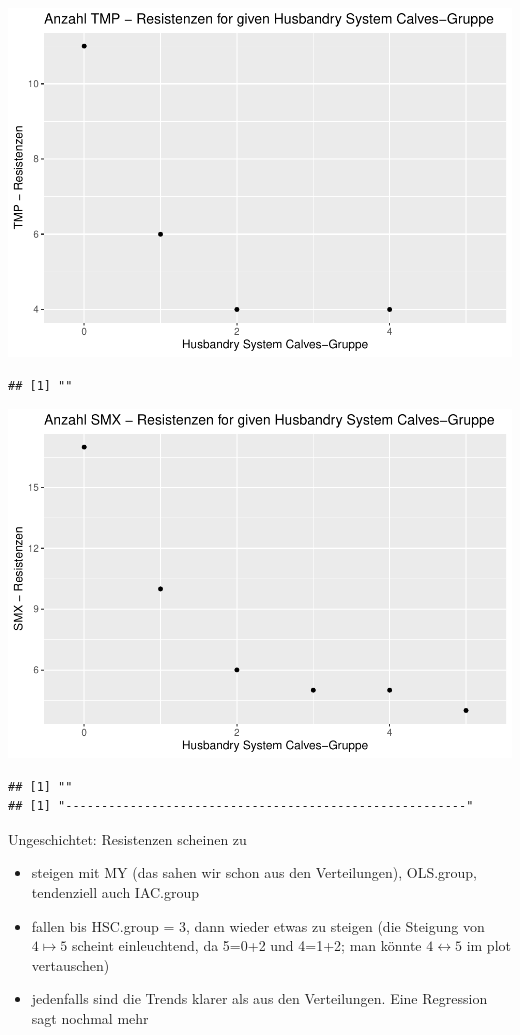 \documentclass[
]{article}
\providecommand{\tightlist}{%
  \setlength{\itemsep}{0pt}\setlength{\parskip}{0pt}}
\begin{document}
\includegraphics{NResistenzen_files/figure-latex/binary_or_nominal_variables-39.pdf}

\begin{verbatim}
## [1] ""
\end{verbatim}

\includegraphics{NResistenzen_files/figure-latex/binary_or_nominal_variables-40.pdf}

\begin{verbatim}
## [1] ""
## [1] "--------------------------------------------------------"
\end{verbatim}

Ungeschichtet: Resistenzen scheinen zu

\begin{itemize}
\tightlist
\item
  steigen mit MY (das sahen wir schon aus den Verteilungen), OLS.group,
  tendenziell auch IAC.group
\item
  fallen bis HSC.group = 3, dann wieder etwas zu steigen (die Steigung
  von \(4\mapsto5\) scheint einleuchtend, da 5=0+2 und 4=1+2; man könnte
  \(4\leftrightarrow 5\) im plot vertauschen)
\item
  jedenfalls sind die Trends klarer als aus den Verteilungen. Eine
  Regression sagt nochmal mehr
\end{itemize}
\end{document}
